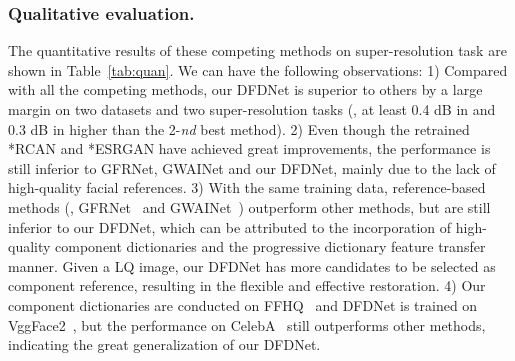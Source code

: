 \documentclass[runningheads]{llncs}
\begin{document}
\subsubsection{Qualitative evaluation.} The quantitative results of these competing methods on super-resolution task are shown in Table~\ref{tab:quan}. We can have the following observations: 1) Compared with all the competing methods, our DFDNet is superior to others by a large margin on two datasets and two super-resolution tasks (\ie, at least 0.4 dB in  and 0.3 dB in  higher than the 2-\textit{nd} best method). 2) Even though the retrained *RCAN and *ESRGAN have achieved great improvements, the performance is still inferior to GFRNet, GWAINet and our DFDNet, mainly due to the lack of high-quality facial references. 3) With the same training data, reference-based methods (\ie, GFRNet~\cite{li2018learning} and GWAINet~\cite{dogan2019exemplar}) outperform other methods, but are still inferior to our DFDNet, which can be attributed to the incorporation of high-quality component dictionaries and the progressive dictionary feature transfer manner. Given a LQ image, our DFDNet has more candidates to be selected as component reference, resulting in the flexible and effective restoration. 4) Our component dictionaries are conducted on FFHQ~\cite{karras2019style} and DFDNet is trained on VggFace2~\cite{cao2018vggface2}, but the performance on CelebA~\cite{liu2015faceattributes} still outperforms other methods, indicating the great generalization of our DFDNet.
\end{document}
